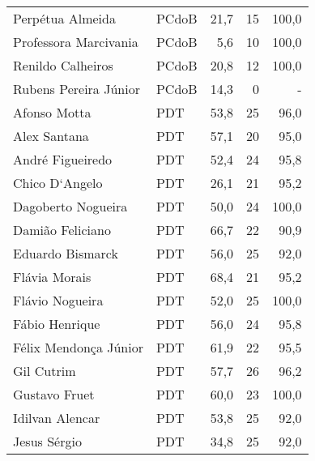 \begin{longtable}{llrrr}
                    Perpétua Almeida &          PCdoB &      21,7 &           15 &      100,0 \\
               Professora Marcivania &          PCdoB &       5,6 &           10 &      100,0 \\
                   Renildo Calheiros &          PCdoB &      20,8 &           12 &      100,0 \\
               Rubens Pereira Júnior &          PCdoB &      14,3 &            0 &          - \\
                        Afonso Motta &            PDT &      53,8 &           25 &       96,0 \\
                        Alex Santana &            PDT &      57,1 &           20 &       95,0 \\
                    André Figueiredo &            PDT &      52,4 &           24 &       95,8 \\
                      Chico D`Angelo &            PDT &      26,1 &           21 &       95,2 \\
                  Dagoberto Nogueira &            PDT &      50,0 &           24 &      100,0 \\
                    Damião Feliciano &            PDT &      66,7 &           22 &       90,9 \\
                    Eduardo Bismarck &            PDT &      56,0 &           25 &       92,0 \\
                       Flávia Morais &            PDT &      68,4 &           21 &       95,2 \\
                     Flávio Nogueira &            PDT &      52,0 &           25 &      100,0 \\
                      Fábio Henrique &            PDT &      56,0 &           24 &       95,8 \\
               Félix Mendonça Júnior &            PDT &      61,9 &           22 &       95,5 \\
                          Gil Cutrim &            PDT &      57,7 &           26 &       96,2 \\
                       Gustavo Fruet &            PDT &      60,0 &           23 &      100,0 \\
                     Idilvan Alencar &            PDT &      53,8 &           25 &       92,0 \\
                        Jesus Sérgio &            PDT &      34,8 &           25 &       92,0 \\

\end{longtable}

